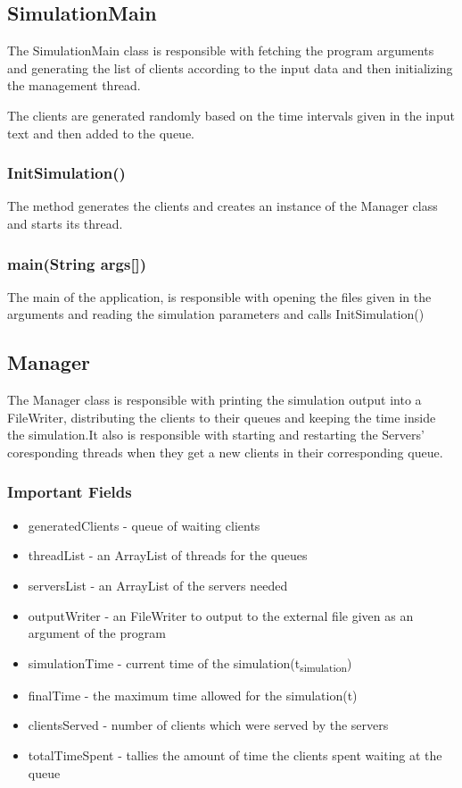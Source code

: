\documentclass[10pt,a4paper]{article}
\begin{document}
\subsection{SimulationMain}
The SimulationMain class is responsible with fetching the program arguments and generating the list of clients according to the input data and then initializing the management thread.\par
The clients are generated randomly based on the time intervals given in the input text and then added to the queue.
\subsubsection{InitSimulation()}
The method generates the clients and creates an instance of the Manager class and starts its thread.
\subsubsection{main(String args[])}
The main of the application, is responsible with opening the files given in the arguments and reading the simulation parameters and calls InitSimulation()
\subsection{Manager}
The Manager class is responsible with printing the simulation output into a FileWriter, distributing the clients to their queues and keeping the time inside the simulation.It also is responsible with starting and restarting the Servers' coresponding threads when they get a new clients in their corresponding queue.
\subsubsection{Important Fields}
\begin{itemize}
\item generatedClients - queue of waiting clients
\item threadList - an ArrayList of threads for the queues
\item serversList - an ArrayList of the servers needed
\item outputWriter - an FileWriter to output to the external file given as an argument of the program
\item simulationTime - current time of the simulation(t\textsubscript{simulation})
\item finalTime - the maximum time allowed for the simulation(t\space\space\space\space\space\space\space\space\space\space\space)
\item clientsServed - number of clients which were served by the servers
\item totalTimeSpent - tallies the amount of time the clients spent waiting at the queue
\end{itemize}
\end{document}
